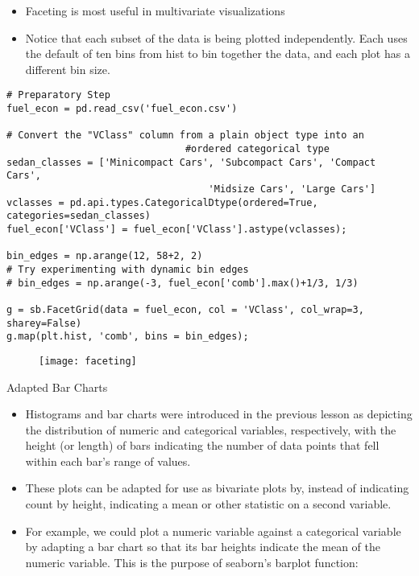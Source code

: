 \documentclass[12pt]{beamer}
\begin{document}
    \begin{frame}[fragile]{}
    	\begin{itemize}
    		\item Faceting is most useful in multivariate visualizations
    		\item Notice that each subset of the data is being plotted independently. Each uses the default of ten bins from hist to bin together the data, and each plot has a different bin size.
    	\end{itemize}
    	\fontsize{8}{1}
    	\begin{verbatim}
# Preparatory Step
fuel_econ = pd.read_csv('fuel_econ.csv')

# Convert the "VClass" column from a plain object type into an 
                               #ordered categorical type
sedan_classes = ['Minicompact Cars', 'Subcompact Cars', 'Compact Cars', 
                                   'Midsize Cars', 'Large Cars']
vclasses = pd.api.types.CategoricalDtype(ordered=True, categories=sedan_classes)
fuel_econ['VClass'] = fuel_econ['VClass'].astype(vclasses);

bin_edges = np.arange(12, 58+2, 2)
# Try experimenting with dynamic bin edges
# bin_edges = np.arange(-3, fuel_econ['comb'].max()+1/3, 1/3)

g = sb.FacetGrid(data = fuel_econ, col = 'VClass', col_wrap=3, sharey=False)
g.map(plt.hist, 'comb', bins = bin_edges);
    	\end{verbatim}
    \end{frame}
    \begin{frame}{}
    	\begin{figure}
    		\centering
    		\texttt{[image: faceting]}
    	\end{figure}
    \end{frame}
    \begin{frame}{Adapted Bar Charts}
    	\begin{itemize}
    		\item Histograms and bar charts were introduced in the previous lesson as depicting the distribution of numeric and categorical variables, respectively, with the height (or length) of bars indicating the number of data points that fell within each bar's range of values. 
    		\item These plots can be adapted for use as bivariate plots by, instead of indicating count by height, indicating a mean or other statistic on a second variable.
    		\item For example, we could plot a numeric variable against a categorical variable by adapting a bar chart so that its bar heights indicate the mean of the numeric variable. This is the purpose of seaborn's barplot function:
    	\end{itemize}
    \end{frame}
\end{document}

